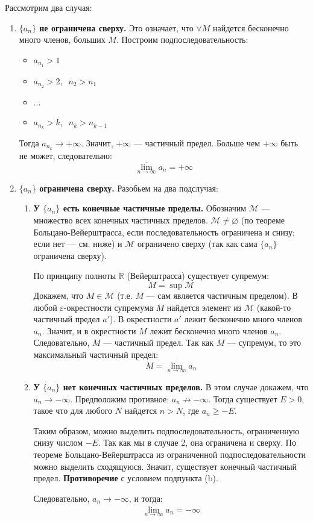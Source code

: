 \begin{tcolorbox}[title=Доказательство (для верхнего предела)]
	Рассмотрим два случая:
	\begin{enumerate}
		\item \textbf{$\{a_n\}$ не ограничена сверху.}
			Это означает, что $\forall M$ найдется бесконечно много членов, больших $M$. Построим подпоследовательность:
			\begin{itemize}
			    \item $a_{n_1} > 1$
			    \item $a_{n_2} > 2, \;\; n_2 > n_1$
			    \item $\dots$
			    \item $a_{n_k} > k, \;\; n_k > n_{k - 1}$
			\end{itemize}
			Тогда $a_{n_k} \to +\infty$. Значит, $+\infty$ — частичный предел.
			Больше чем $+\infty$ быть не может, следовательно:
			\[ \overline{\lim_{n\to\infty}} a_n = +\infty \]

		\item \textbf{$\{a_n\}$ ограничена сверху.}
			Разобьем на два подслучая:
			\begin{enumerate}
				\item \textbf{У $\{a_n\}$ есть конечные частичные пределы.}
					Обозначим $\mathcal{M}$ — множество всех конечных частичных пределов.
					$\mathcal{M} \neq \varnothing$ (по теореме Больцано-Вейерштрасса, если последовательность ограничена и снизу; если нет — см. ниже) и $\mathcal{M}$ ограничено сверху (так как сама $\{a_n\}$ ограничена сверху).
					
					По принципу полноты $\mathbb{R}$ (Вейерштрасса) существует супремум:
					\[ M = \sup \mathcal{M} \]
					Докажем, что $M \in \mathcal{M}$ (т.е. $M$ — сам является частичным пределом).
					В любой $\varepsilon$-окрестности супремума $M$ найдется элемент из $\mathcal{M}$ (какой-то частичный предел $a'$). В окрестности $a'$ лежит бесконечно много членов $a_n$. Значит, и в окрестности $M$ лежит бесконечно много членов $a_n$.
					Следовательно, $M$ — частичный предел.
					Так как $M$ — супремум, то это максимальный частичный предел:
					\[ M = \overline{\lim_{n\to\infty}} a_n \]

				\item \textbf{У $\{a_n\}$ нет конечных частичных пределов.}
					В этом случае докажем, что $a_n \to -\infty$.
					Предположим противное: $a_n \not\to -\infty$.
					Тогда существует $E > 0$, такое что для любого $N$ найдется $n > N$, где $a_n \ge -E$.
					
					Таким образом, можно выделить подпоследовательность, ограниченную снизу числом $-E$. Так как мы в случае 2, она ограничена и сверху.
					По теореме Больцано-Вейерштрасса из ограниченной подпоследовательности можно выделить сходящуюся.
					Значит, существует конечный частичный предел. \textbf{Противоречие} с условием подпункта (b).
					
					Следовательно, $a_n \to -\infty$, и тогда:
					\[ \overline{\lim_{n\to\infty}} a_n = -\infty \]
			\end{enumerate}
	\end{enumerate}
\end{tcolorbox}
